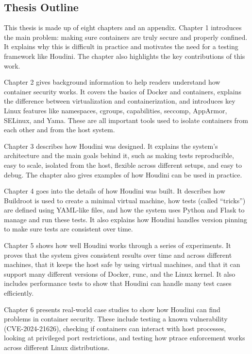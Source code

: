 \documentclass[12pt]{report}
\begin{document}
\begin{doublespace}
\section{Thesis Outline}

This thesis is made up of eight chapters and an appendix. Chapter 1 introduces the main problem: making sure containers are truly secure and properly confined. It explains why this is difficult in practice and motivates the need for a testing framework like Houdini. The chapter also highlights the key contributions of this work.

Chapter 2 gives background information to help readers understand how container security works. It covers the basics of Docker and containers, explains the difference between virtualization and containerization, and introduces key Linux features like namespaces, cgroups, capabilities, seccomp, AppArmor, SELinux, and Yama. These are all important tools used to isolate containers from each other and from the host system.

Chapter 3 describes how Houdini was designed. It explains the system’s architecture and the main goals behind it, such as making tests reproducible, easy to scale, isolated from the host, flexible across different setups, and easy to debug. The chapter also gives examples of how Houdini can be used in practice.

Chapter 4 goes into the details of how Houdini was built. It describes how Buildroot is used to create a minimal virtual machine, how tests (called “tricks”) are defined using YAML-like files, and how the system uses Python and Flask to manage and run these tests. It also explains how Houdini handles version pinning to make sure tests are consistent over time.

Chapter 5 shows how well Houdini works through a series of experiments. It proves that the system gives consistent results over time and across different machines, that it keeps the host safe by using virtual machines, and that it can support many different versions of Docker, runc, and the Linux kernel. It also includes performance tests to show that Houdini can handle many test cases efficiently.

Chapter 6 presents real-world case studies to show how Houdini can find problems in container security. These include testing a known vulnerability (CVE-2024-21626), checking if containers can interact with host processes, looking at privileged port restrictions, and testing how ptrace enforcement works across different Linux distributions.


\end{doublespace}
\end{document}

